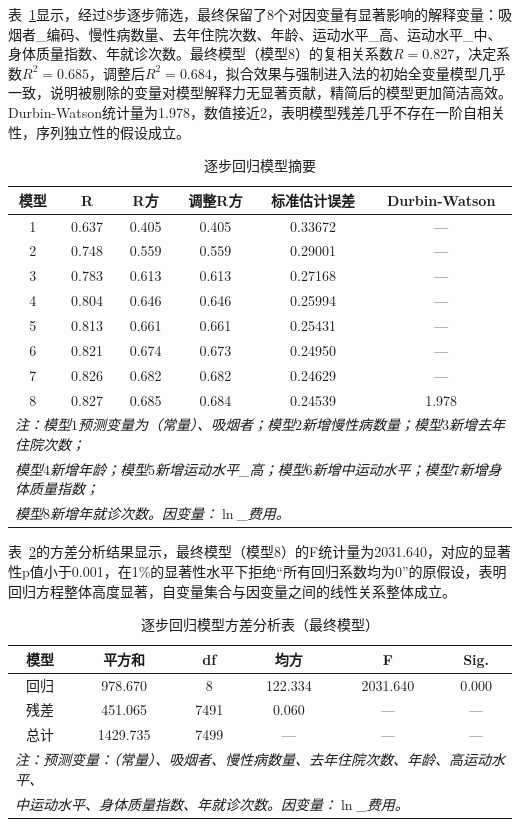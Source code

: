 \documentclass[a4paper]{ctexart}
\begin{document}
表~\ref{tab:modelsum2}显示，经过8步逐步筛选，最终保留了8个对因变量有显著影响的解释变量：吸烟者\_编码、慢性病数量、去年住院次数、年龄、运动水平\_高、运动水平\_中、身体质量指数、年就诊次数。最终模型（模型8）的复相关系数\(R=0.827\)，决定系数\(R^2=0.685\)，调整后\(R^2=0.684\)，拟合效果与强制进入法的初始全变量模型几乎一致，说明被剔除的变量对模型解释力无显著贡献，精简后的模型更加简洁高效。Durbin-Watson统计量为1.978，数值接近2，表明模型残差几乎不存在一阶自相关性，序列独立性的假设成立。

\begin{table}[H]
\centering
\caption{逐步回归模型摘要}
\label{tab:modelsum2}
\begin{tabular}{c c c c c c}
\toprule
模型 & R & R方 & 调整R方 & 标准估计误差 & Durbin-Watson \\
\midrule
1 & 0.637 & 0.405 & 0.405 & 0.33672 & — \\
2 & 0.748 & 0.559 & 0.559 & 0.29001 & — \\
3 & 0.783 & 0.613 & 0.613 & 0.27168 & — \\
4 & 0.804 & 0.646 & 0.646 & 0.25994 & — \\
5 & 0.813 & 0.661 & 0.661 & 0.25431 & — \\
6 & 0.821 & 0.674 & 0.673 & 0.24950 & — \\
7 & 0.826 & 0.682 & 0.682 & 0.24629 & — \\
8 & 0.827 & 0.685 & 0.684 & 0.24539 & 1.978 \\
\bottomrule
\multicolumn{6}{l}{\textit{注：模型$1$预测变量为（常量）、吸烟者；模型$2$新增慢性病数量；模型$3$新增去年住院次数；}} \\
\multicolumn{6}{l}{\textit{模型$4$新增年龄；模型$5$新增运动水平\_高；模型$6$新增中运动水平；模型$7$新增身体质量指数；}} \\
\multicolumn{6}{l}{\textit{模型$8$新增年就诊次数。因变量：\(\ln\)\_费用。}}
\end{tabular}
\end{table}

表~\ref{tab:anova2}的方差分析结果显示，最终模型（模型8）的F统计量为2031.640，对应的显著性p值小于0.001，在1\%的显著性水平下拒绝“所有回归系数均为0”的原假设，表明回归方程整体高度显著，自变量集合与因变量之间的线性关系整体成立。

\begin{table}[H]
\centering
\caption{逐步回归模型方差分析表（最终模型）}
\label{tab:anova2}
\begin{tabular}{c c c c c c}
\toprule
模型 & 平方和 & df & 均方 & F & Sig. \\
\midrule
回归 & 978.670 & 8 & 122.334 & 2031.640 & 0.000 \\
残差 & 451.065 & 7491 & 0.060 & — & — \\
总计 & 1429.735 & 7499 & — & — & — \\
\bottomrule
\multicolumn{6}{l}{\textit{注：预测变量：（常量）、吸烟者、慢性病数量、去年住院次数、年龄、高运动水平、}} \\
\multicolumn{6}{l}{\textit{中运动水平、身体质量指数、年就诊次数。因变量：\(\ln\)\_费用。}}
\end{tabular}
\end{table}
\end{document}
